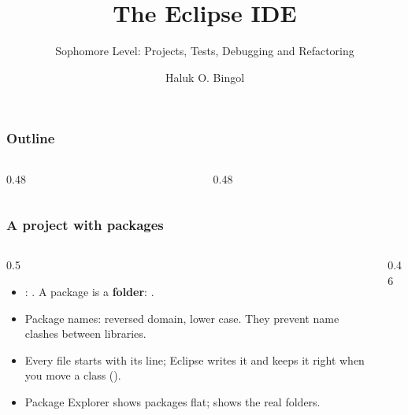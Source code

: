\documentclass[aspectratio=169,10pt,compress]{beamer}
\title{The Eclipse IDE}
\subtitle{Sophomore Level: Projects, Tests, Debugging and Refactoring}
\author[Bingol]{Haluk O. Bingol}
\institute[FCIS]{
    Faculty of Computer and Information Sciences\\
    Yeditepe University
}
\date{
	{\tiny \hbTimeStamp}
}
\begin{document}
\begin{frame}[t,fragile]
  \titlepage
\end{frame}




\begin{frame}[t,fragile] \frametitle{Outline}
  \begin{columns}[T]
    \begin{column}{0.48\textwidth}
      \tableofcontents[sections={1-4}, hideallsubsections]
    \end{column}
    \begin{column}{0.48\textwidth}
      \tableofcontents[sections={5-8}, hideallsubsections]
    \end{column}
  \end{columns}
\end{frame}





\begin{frame}[t,fragile] \frametitle{A project with packages}
  \begin{columns}[T]
    \begin{column}{0.5\textwidth}
      \begin{itemize}\small
        \item {}: . A package is a \textbf{folder}:
              .
        \item Package names: reversed domain, lower case. They prevent name clashes between libraries.
        \item Every file starts with its  line; Eclipse writes it and keeps it right when you
              move a class ().
        \item Package Explorer shows packages flat;  shows the real folders.
      \end{itemize}
    \end{column}
    \begin{column}{0.46\textwidth}
    \end{column}
  \end{columns}
\end{frame}
\end{document}
